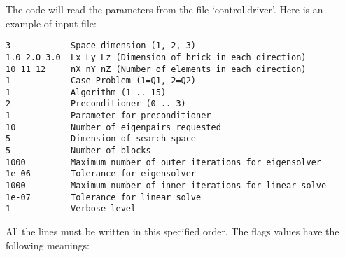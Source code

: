 \documentclass[11pt]{article}
\begin{document}
The code will read the parameters from the file `control.driver'.
Here is an example of input file:
\begin{verbatim}3            Space dimension (1, 2, 3)
1.0 2.0 3.0  Lx Ly Lz (Dimension of brick in each direction)
10 11 12     nX nY nZ (Number of elements in each direction)
1            Case Problem (1=Q1, 2=Q2)
1            Algorithm (1 .. 15)
2            Preconditioner (0 .. 3)
1            Parameter for preconditioner
10           Number of eigenpairs requested
5            Dimension of search space
5            Number of blocks
1000         Maximum number of outer iterations for eigensolver
1e-06        Tolerance for eigensolver
1000         Maximum number of inner iterations for linear solve
1e-07        Tolerance for linear solve
1            Verbose level
\end{verbatim}
All the lines must be written in this specified order.
The flags values have the following meanings:
\end{document}
